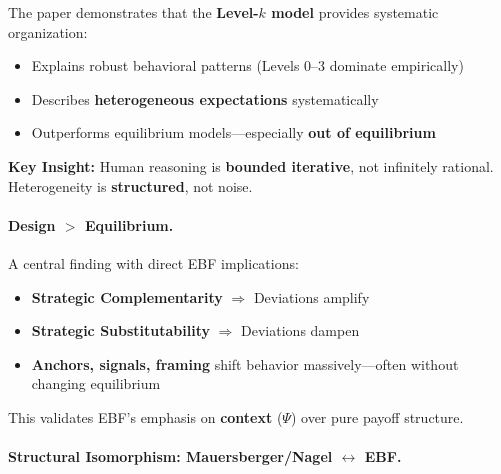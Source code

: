 \begin{tcolorbox}[colback=green!5!white, colframe=green!75!black,
    title=\textbf{Level-$k$ as Cognitive Operating System}]

The paper demonstrates that the \textbf{Level-$k$ model} provides systematic organization:

\begin{itemize}[nosep]
    \item Explains robust behavioral patterns (Levels 0--3 dominate empirically)
    \item Describes \textbf{heterogeneous expectations} systematically
    \item Outperforms equilibrium models---especially \textbf{out of equilibrium}
\end{itemize}

\textbf{Key Insight:} Human reasoning is \textbf{bounded iterative}, not infinitely rational.
Heterogeneity is \textbf{structured}, not noise.

\end{tcolorbox}

\paragraph{Design $>$ Equilibrium.}
A central finding with direct EBF implications:

\begin{itemize}[nosep]
    \item \textbf{Strategic Complementarity} $\Rightarrow$ Deviations amplify
    \item \textbf{Strategic Substitutability} $\Rightarrow$ Deviations dampen
    \item \textbf{Anchors, signals, framing} shift behavior massively---often without changing equilibrium
\end{itemize}

This validates EBF's emphasis on \textbf{context} ($\Psi$) over pure payoff structure.

\paragraph{Structural Isomorphism: Mauersberger/Nagel $\leftrightarrow$ EBF.}

